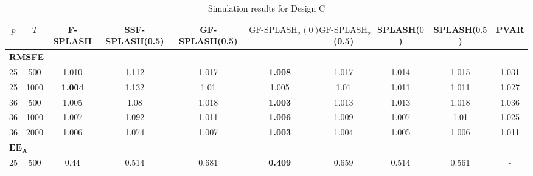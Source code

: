 \begin{landscape}
    \bgroup
    \def\arraystretch{1.3}
    \begin{table}[!h]
    \footnotesize
    \centering
    \caption{Simulation results for Design C}
    \label{tab:results_designC}
    \begin{tabular}{cccccccccc}    
    \hline \hline
    $p$  &  $T$   &  F-SPLASH  &  SSF-SPLASH(0.5)  &  GF-SPLASH(0.5)  &  $\text{GF-SPLASH}_\sigma(0)$  &  $\text{GF-SPLASH}_\sigma$(0.5)  &  SPLASH($0$)  &  SPLASH($0.5$)  &  PVAR  \\
    \hline
    \multicolumn{10}{l}{\textbf{RMSFE}} \\
	\hline
	 25  & 500  & 1.010                 &                 1.112                 &                      1.017                       & \textbf{1.008}                                 &                      1.017                       &          1.014           &           1.015            &       1.031       \\
	 25  & 1000 & \textbf{1.004}        &                 1.132                 &                       1.01                       & 1.005                                          &                       1.01                       &          1.011           &           1.011            &       1.027       \\
	 36  & 500  & 1.005                 &                 1.08                  &                      1.018                       & \textbf{1.003}                                 &                      1.013                       &          1.013           &           1.018            &       1.036       \\
	 36  & 1000 & 1.007                 &                 1.092                 &                      1.011                       & \textbf{1.006}                                 &                      1.009                       &          1.007           &            1.01            &       1.025       \\
	 36  & 2000 & 1.006                 &                 1.074                 &                      1.007                       & \textbf{1.003}                                 &                      1.004                       &          1.005           &           1.006            &       1.011       \\
	\hline
	\multicolumn{10}{l}{$\mathbf{EE_A}$} \\
	\hline
	 25  & 500  &         0.44          &                 0.514                 &                      0.681                       & \textbf{0.409}                                 &                      0.659                       &          0.514           &           0.561            & -                 \\

\end{tabular}
\end{table}
\end{landscape}
